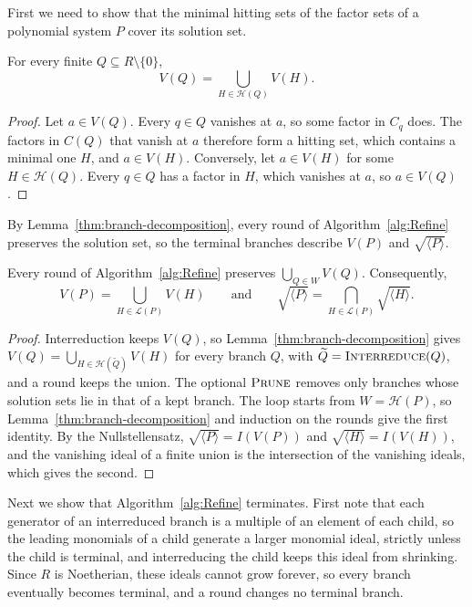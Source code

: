 First we need to show that the minimal hitting sets of the factor sets of a
polynomial system $P$ cover its solution set.

\begin{lemma}
  \label{thm:branch-decomposition}
  For every finite $Q\subseteq R\setminus\{0\}$,
  \[
    V(Q) = \bigcup_{H \in \mathcal{H}(Q)} V(H).
  \]
\end{lemma}

\begin{proof}
  Let $a\in V(Q)$. Every $q\in Q$ vanishes at $a$, so some factor in $C_q$
  does. The factors in $C(Q)$ that vanish at $a$ therefore form a hitting set,
  which contains a minimal one $H$, and $a\in V(H)$. Conversely, let $a\in V(H)$
  for some $H\in\mathcal H(Q)$. Every $q\in Q$ has a factor in $H$, which
  vanishes at $a$, so $a\in V(Q)$.
\end{proof}

By Lemma~\ref{thm:branch-decomposition}, every round of
Algorithm~\ref{alg:Refine} preserves the solution set, so the terminal
branches describe $V(P)$ and $\sqrt{\langle P\rangle}$.

\begin{lemma}
  \label{lem:recursive-refinement}
  Every round of Algorithm~\ref{alg:Refine} preserves
  $\bigcup_{Q\in W}V(Q)$. Consequently,
  \[
    V(P)=\bigcup_{H\in\mathcal L(P)}V(H)
    \qquad\text{and}\qquad
    \sqrt{\langle P\rangle}=\bigcap_{H\in\mathcal L(P)}\sqrt{\langle H\rangle}.
  \]
\end{lemma}

\begin{proof}
  Interreduction keeps $V(Q)$, so Lemma~\ref{thm:branch-decomposition} gives
  $V(Q)=\bigcup_{H\in\mathcal H(\widetilde Q)}V(H)$ for every branch $Q$, with
  $\widetilde Q=\Call{Interreduce}{Q}$, and a round keeps the union.
  The optional $\Call{Prune}{}$ removes only branches
  whose solution sets lie in that of a kept branch. The loop starts from
  $W=\mathcal H(P)$, so Lemma~\ref{thm:branch-decomposition} and induction on
  the rounds give the first identity. By the Nullstellensatz,
  $\sqrt{\langle P\rangle}=I(V(P))$ and $\sqrt{\langle H\rangle}=I(V(H))$, and
  the vanishing ideal of a finite union is the intersection of the vanishing
  ideals, which gives the second.
\end{proof}

Next we show that Algorithm~\ref{alg:Refine} terminates. First note that each
generator of an interreduced branch is a multiple of an element of each child,
so the leading monomials of a child generate a larger monomial ideal, strictly
unless the child is terminal, and interreducing the child keeps this ideal from
shrinking. Since $R$ is Noetherian, these ideals cannot grow forever, so every
branch eventually becomes terminal, and a round changes no terminal branch.

